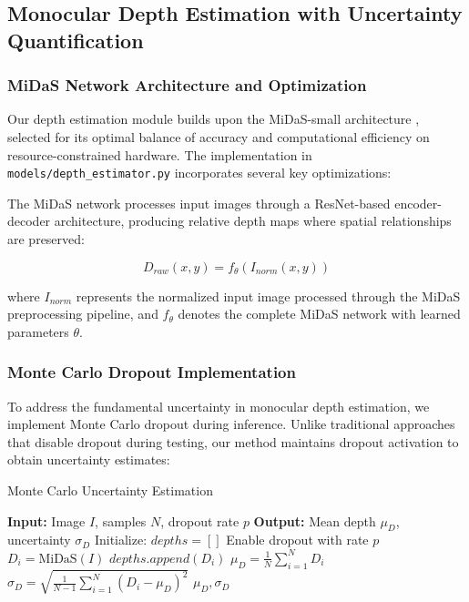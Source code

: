 \documentclass[10pt]{article}
\begin{document}
\subsection{Monocular Depth Estimation with Uncertainty Quantification}

\subsubsection{MiDaS Network Architecture and Optimization}

Our depth estimation module builds upon the MiDaS-small architecture \cite{ranftl2020towards}, selected for its optimal balance of accuracy and computational efficiency on resource-constrained hardware. The implementation in \texttt{models/depth\_estimator.py} incorporates several key optimizations:

The MiDaS network processes input images through a ResNet-based encoder-decoder architecture, producing relative depth maps where spatial relationships are preserved:

\begin{equation}
D_{raw}(x,y) = f_{\theta}(I_{norm}(x,y))
\label{eq:midas_forward}
\end{equation}

where $I_{norm}$ represents the normalized input image processed through the MiDaS preprocessing pipeline, and $f_{\theta}$ denotes the complete MiDaS network with learned parameters $\theta$.

\subsubsection{Monte Carlo Dropout Implementation}

To address the fundamental uncertainty in monocular depth estimation, we implement Monte Carlo dropout during inference. Unlike traditional approaches that disable dropout during testing, our method maintains dropout activation to obtain uncertainty estimates:

\begin{algorithm}
\caption{Monte Carlo Uncertainty Estimation}
\begin{algorithmic}
\STATE \textbf{Input:} Image $I$, samples $N$, dropout rate $p$
\STATE \textbf{Output:} Mean depth $\mu_D$, uncertainty $\sigma_D$
\STATE Initialize: $depths = []$
    \STATE Enable dropout with rate $p$
    \STATE $D_i = \text{MiDaS}(I)$
    \STATE $depths.append(D_i)$
\ENDFOR
\STATE $\mu_D = \frac{1}{N} \sum_{i=1}^{N} D_i$
\STATE $\sigma_D = \sqrt{\frac{1}{N-1} \sum_{i=1}^{N} (D_i - \mu_D)^2}$
\RETURN $\mu_D, \sigma_D$
\end{algorithmic}
\end{algorithm}
\end{document}
